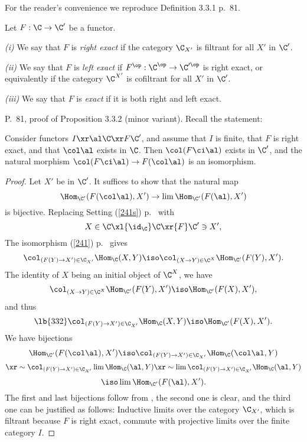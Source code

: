 \documentclass[12pt]{article}
\theoremstyle{remark}
\theoremstyle{definition}
\begin{document}
% 

For the reader's convenience we reproduce Definition 3.3.1 p.~81. 

\begin{df} 
Let $F:\C\to\C'$ be a functor.

\nn\emph{(i)} We say that $F$ is \emph{right exact} if the category $\C_{X'}$ is filtrant for all $X'$ in $\C'$. 

\nn\emph{(ii)} We say that $F$ is \emph{left exact} if $F^{\op}:\C^{\op}\to\C'^{\op}$ is right exact, or equivalently if the category $\C^{X'}$ is cofiltrant for all $X'$ in $\C'$.

\nn\emph{(iii)} We say that $F$ is \emph{exact} if it is both right and left exact.
\end{df}

\begin{s} 
P.~81, proof of Proposition 3.3.2 (minor variant). Recall the statement:

\begin{prop}[Proposition 3.3.2 p.~81] 
Consider functors $I\xr\al\C\xr F\C'$, and assume that $I$ is finite, that $F$ is right exact, and that $\col\al$ exists in $\C$. Then $\col(F\ci\al)$ exists in $\C'$, and the natural morphism $\col(F\ci\al)\to F(\col\al)$ is an isomorphism. 
\end{prop} 

\begin{proof}
Let $X'$ be in $\C'$. It suffices to show that the natural map 
$$
\Hom_{\C'}(F(\col\al),X')\to\lim\Hom_{\C'}(F(\al),X')
$$ 
is bijective. Replacing Setting (\ref{241s}) p.~ with 
$$
X\in\C\xl{\id_\C}\C\xr{F}\C'\ni X', 
$$ 
The isomorphism (\ref{241}) p.~ gives 
$$
\col_{(F(Y)\to X')\in\C_{X'}}\Hom_\C(X,Y)\iso\col_{(X\to Y)\in\C^X}\Hom_{\C'}(F(Y),X').
$$ 
The identity of $X$ being an initial object of $\C^X$, we have 
$$
\col_{(X\to Y)\in\C^X}\Hom_{\C'}(F(Y),X')\iso\Hom_{\C'}(F(X),X'),
$$ 
and thus
%
\begin{equation}\lb{332} 
\col_{(F(Y)\to X')\in\C_{X'}}\Hom_\C(X,Y)\iso\Hom_{\C'}(F(X),X').
\end{equation} 
%
We have bijections 
$$ 
\Hom_{\C'}(F(\col\al),X')\iso\col_{(F(Y)\to X')\in\C_{X'}}\Hom_\C(\col\al,Y)
$$
$$
\xr\sim\col_{(F(Y)\to X')\in\C_{X'}}\lim\Hom_\C(\al,Y)\xr\sim\lim\col_{(F(Y)\to X')\in\C_{X'}}\Hom_\C(\al,Y)
$$
$$
\iso\lim\Hom_{\C'}(F(\al),X'). 
$$ 
The first and last bijections follow from , the second one is clear, and the third one can be justified as follows: Inductive limits over the category $\C_{X'}$, which is filtrant because $F$ is right exact, commute with projective limits over the finite category $I$.
\end{proof}
\end{s}
\end{document}
